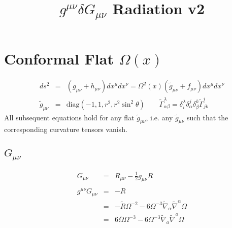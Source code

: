 \documentclass[10pt,letterpaper]{article}
\title{$g^{\mu\nu}\delta G_{\mu\nu}$ Radiation v2}
\date{}
\numberwithin{equation}{section}
\begin{document}
 
\maketitle
\noindent 
\section{Conformal Flat $\Omega(x)$}
\begin{eqnarray}
ds^2 &=& (g_{\mu\nu} + h_{\mu\nu})dx^\mu dx^\nu = \Omega^2(x)(\tilde g_{\mu\nu} + f_{\mu\nu})dx^\mu dx^\nu
\label{geom1}\\
\tilde g_{\mu\nu} &=& \text{diag}\left(-1,1,r^2,r^2\sin^2\theta\right)\qquad \tilde \Gamma^{\lambda}_{\alpha\beta} = \delta^\lambda_i \delta^j_\alpha \delta^k_\beta \tilde \Gamma^{i}_{jk}
\end{eqnarray}
All subsequent equations hold for any flat $\tilde g_{\mu\nu}$, i.e. any $\tilde g_{\mu\nu}$ such that the corresponding curvature tensors vanish. 
%
\subsection{$G_{\mu\nu}$}
\begin{eqnarray}
G_{\mu\nu} &=& R_{\mu\nu} - \tfrac12 g_{\mu\nu} R
\\ \nonumber\\
g^{\mu\nu}G_{\mu\nu} &=& -R
\nonumber\\
&=& - \tilde{R} \Omega^{-2} - 6 \Omega^{-3} \tilde{\nabla}_{\alpha }\tilde{\nabla}^{\alpha }\Omega 
\nonumber\\
&=& 6 \overset{..}{\Omega} \Omega^{-3} - 6 \Omega^{-3} \tilde{\nabla}_{a}\tilde{\nabla}^{a}\Omega 
\label{Gtr}
\end{eqnarray}
\end{document}
